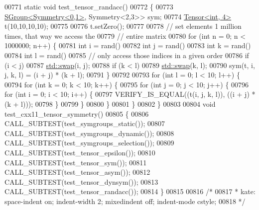 \begin{DoxyCode}
00771 \textcolor{keyword}{static} \textcolor{keywordtype}{void} test\_tensor\_randacc()
00772 \{
00773   \hyperlink{class_eigen_1_1_s_group}{SGroup<Symmetry<0,1>}, Symmetry<2,3>> sym;
00774   \hyperlink{class_eigen_1_1_tensor}{Tensor<int, 4>} t(10,10,10,10);
00775 
00776   t.setZero();
00777 
00778   \textcolor{comment}{// set elements 1 million times, that way we access the}
00779   \textcolor{comment}{// entire matrix}
00780   \textcolor{keywordflow}{for} (\textcolor{keywordtype}{int} n = 0; n < 1000000; n++) \{
00781     \textcolor{keywordtype}{int} i = rand() %
00782     \textcolor{keywordtype}{int} j = rand() %
00783     \textcolor{keywordtype}{int} k = rand() %
00784     \textcolor{keywordtype}{int} l = rand() %
00785     \textcolor{comment}{// only access those indices in a given order}
00786     \textcolor{keywordflow}{if} (i < j)
00787       \hyperlink{endian_8c_a3ca5ecd34b04d6a243c054ac3a57f68d}{std::swap}(i, j);
00788     \textcolor{keywordflow}{if} (k < l)
00789       \hyperlink{endian_8c_a3ca5ecd34b04d6a243c054ac3a57f68d}{std::swap}(k, l);
00790     sym(t, i, j, k, l) = (i + j) * (k + l);
00791   \}
00792 
00793   \textcolor{keywordflow}{for} (\textcolor{keywordtype}{int} l = 0; l < 10; l++) \{
00794     \textcolor{keywordflow}{for} (\textcolor{keywordtype}{int} k = 0; k < 10; k++) \{
00795       \textcolor{keywordflow}{for} (\textcolor{keywordtype}{int} j = 0; j < 10; j++) \{
00796         \textcolor{keywordflow}{for} (\textcolor{keywordtype}{int} i = 0; i < 10; i++) \{
00797           VERIFY\_IS\_EQUAL((t(i, j, k, l)), ((i + j) * (k + l)));
00798         \}
00799       \}
00800     \}
00801   \}
00802 \}
00803 
00804 \textcolor{keywordtype}{void} test\_cxx11\_tensor\_symmetry()
00805 \{
00806   CALL\_SUBTEST(test\_symgroups\_static());
00807   CALL\_SUBTEST(test\_symgroups\_dynamic());
00808   CALL\_SUBTEST(test\_symgroups\_selection());
00809   CALL\_SUBTEST(test\_tensor\_epsilon());
00810   CALL\_SUBTEST(test\_tensor\_sym());
00811   CALL\_SUBTEST(test\_tensor\_asym());
00812   CALL\_SUBTEST(test\_tensor\_dynsym());
00813   CALL\_SUBTEST(test\_tensor\_randacc());
00814 \}
00815 
00816 \textcolor{comment}{/*}
00817 \textcolor{comment}{ * kate: space-indent on; indent-width 2; mixedindent off; indent-mode cstyle;}
00818 \textcolor{comment}{ */}
\end{DoxyCode}
